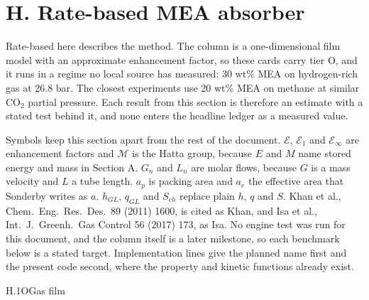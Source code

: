 \section{H. Rate-based MEA absorber}\label{sec:H}
Rate-based here describes the method. The column is a one-dimensional film model with an approximate enhancement factor, so these cards carry tier O, and it runs in a regime no local source has measured: 30 wt\% MEA on hydrogen-rich gas at 26.8 bar. The closest experiments use 20 wt\% MEA on methane at similar CO$_2$ partial pressure. Each result from this section is therefore an estimate with a stated test behind it, and none enters the headline ledger as a measured value.

Symbols keep this section apart from the rest of the document. $\mathcal E$, $\mathcal E_1$ and $\mathcal E_\infty$ are enhancement factors and $\mathcal M$ is the Hatta group, because $E$ and $M$ name stored energy and mass in Section A. $G_n$ and $L_n$ are molar flows, because $G$ is a mass velocity and $L$ a tube length. $a_p$ is packing area and $a_e$ the effective area that Sonderby writes as $a$. $h_{GL}$, $q_{GL}$ and $S_{ch}$ replace plain $h$, $q$ and $S$. Khan et al., Chem.\ Eng.\ Res.\ Des.\ 89 (2011) 1600, is cited as Khan, and Isa et al., Int.\ J.\ Greenh.\ Gas Control 56 (2017) 173, as Isa. No engine test was run for this document, and the column itself is a later milestone, so each benchmark below is a stated target. Implementation lines give the planned name first and the present code second, where the property and kinetic functions already exist.

\begin{eqcard}{H.1}{O}{Gas film}
\end{eqcard}

